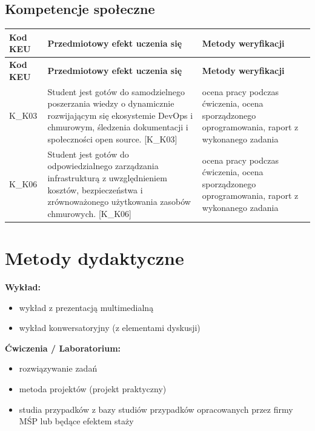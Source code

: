\documentclass[12pt, a4paper]{article}
\newcommand{\thdrule}{\noalign{\global\setlength{\extrarowheight}{0pt}}}
\newcommand{\thdend}{\noalign{\global\setlength{\extrarowheight}{3pt}}}
\begin{document}
\subsection*{Kompetencje społeczne}
{\scriptsize
\begin{longtable}{m{1.6cm}m{9.0cm}m{4.2cm}}
\thdrule\toprule
\rowcolor{pjatkRed} {\color{white}\footnotesize\textbf{\vphantom{Ag}Kod KEU}} & {\color{white}\footnotesize\textbf{\vphantom{Ag}Przedmiotowy efekt uczenia się}} & {\color{white}\footnotesize\textbf{\vphantom{Ag}Metody weryfikacji}} \\
\midrule\thdend
\endfirsthead
\thdrule\toprule
\rowcolor{pjatkRed} {\color{white}\footnotesize\textbf{\vphantom{Ag}Kod KEU}} & {\color{white}\footnotesize\textbf{\vphantom{Ag}Przedmiotowy efekt uczenia się}} & {\color{white}\footnotesize\textbf{\vphantom{Ag}Metody weryfikacji}} \\
\midrule\thdend
\endhead
  \rowcolor{tableRowLight} K\_K03 & Student jest gotów do samodzielnego poszerzania wiedzy o dynamicznie rozwijającym się ekosystemie DevOps i chmurowym, śledzenia dokumentacji i społeczności open source. {[}K\_K03{]} & ocena pracy podczas ćwiczenia, ocena sporządzonego oprogramowania, raport z wykonanego zadania \\
  \rowcolor{tableRowAlt} K\_K06 & Student jest gotów do odpowiedzialnego zarządzania infrastrukturą z uwzględnieniem kosztów, bezpieczeństwa i zrównoważonego użytkowania zasobów chmurowych. {[}K\_K06{]} & ocena pracy podczas ćwiczenia, ocena sporządzonego oprogramowania, raport z wykonanego zadania \\
\bottomrule
\end{longtable}}

\section{Metody dydaktyczne}

\textbf{Wykład:}
\begin{itemize}
  \item wykład z prezentacją multimedialną
  \item wykład konwersatoryjny (z elementami dyskusji)
\end{itemize}
\vspace{4pt}
\textbf{Ćwiczenia / Laboratorium:}
\begin{itemize}
  \item rozwiązywanie zadań
  \item metoda projektów (projekt praktyczny)
  \item studia przypadków z bazy studiów przypadków opracowanych przez firmy MŚP lub będące efektem staży
\end{itemize}
\vspace{4pt}
\end{document}
